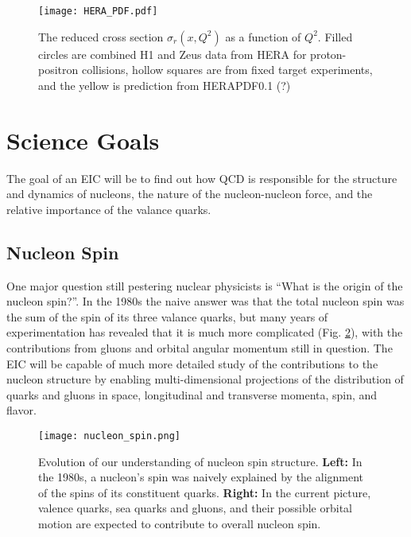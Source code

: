 \begin{figure}[ht]
	\centering
	\texttt{[image: HERA\_PDF.pdf]}
	\caption{The reduced cross section $\sigma_{r}(x,Q^2)$ as a function of $Q^2$. Filled circles are combined H1 and Zeus data from HERA for proton-positron collisions, hollow squares are from fixed target experiments, and the yellow is prediction from HERAPDF0.1 (?)}
	\label{fig:HERA_pdf2}
\end{figure}

\section{Science Goals}
The goal of an EIC will be to find out how QCD is responsible for the structure and dynamics of nucleons, the nature of the nucleon-nucleon force, and the relative importance of the valance quarks.

\subsection{Nucleon Spin}
One major question still pestering nuclear physicists is ``What is the origin of the nucleon spin?''. In the 1980s the naive answer was that the total nucleon spin was the sum of the spin of its three valance quarks, but many years of experimentation has revealed that it is much more complicated (Fig. \ref{fig:nucleon_spin}), with the contributions from gluons and orbital angular momentum still in question. The EIC will be capable of much more detailed study of the contributions to the nucleon structure by enabling multi-dimensional projections of the distribution of quarks and gluons in space, longitudinal and transverse momenta, spin, and flavor.

\begin{figure}[ht]
	\centering
	\texttt{[image: nucleon\_spin.png]}
	\caption{Evolution of our understanding of nucleon spin structure. \textbf{Left:} In the 1980s, a nucleon’s spin was naively explained by the alignment of the spins of its constituent quarks. \textbf{Right:} In the current picture, valence quarks, sea quarks and gluons, and their possible orbital motion are expected to contribute to overall nucleon spin.}
	\label{fig:nucleon_spin}
\end{figure}

